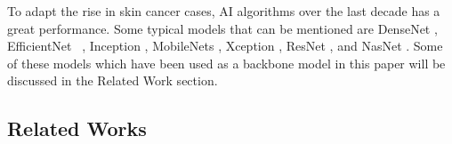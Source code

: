\documentclass[sensors,article,accept,pdftex,moreauthors]{Definitions/mdpi}
\begin{document}
	To adapt the rise in skin cancer cases, AI algorithms over the last decade has a great performance. Some typical models that can be mentioned are DenseNet \cite{06993}, EfficientNet  ~\cite{04861}, Inception  \cite{00567,07261}, MobileNets \cite{04861,04381,02244}, {Xception \mbox{\cite{02357}}}, ResNet \cite{03385,05027}, and NasNet   \cite{07012}. Some of these models which have been used as a backbone model in this paper will be discussed in the Related Work section.
	
	\subsection{Related Works}
		
		
		
\end{document}
